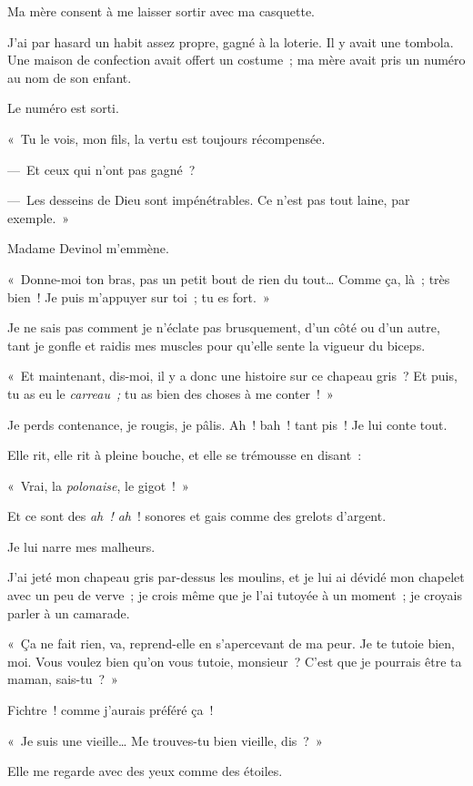 \documentclass[french,twoside]{book} %
\begin{document}
Ma mère consent à me laisser sortir avec ma casquette.\par
J’ai par hasard un habit assez propre, gagné à la loterie. Il y avait une tombola. Une maison de confection avait offert un costume ; ma mère avait pris un numéro au nom de son enfant.\par
Le numéro est sorti.\par
« Tu le vois, mon fils, la vertu est toujours récompensée.\par
— Et ceux qui n’ont pas gagné ?\par
— Les desseins de Dieu sont impénétrables. Ce n’est pas tout laine, par exemple. »\par
\bigbreak
\noindent Madame Devinol m’emmène.\par
« Donne-moi ton bras, pas un petit bout de rien du tout… Comme ça, là ; très bien ! Je puis m’appuyer sur toi ; tu es fort. »\par
Je ne sais pas comment je n’éclate pas brusquement, d’un côté ou d’un autre, tant je gonfle et raidis mes muscles pour qu’elle sente la vigueur du biceps.\par
« Et maintenant, dis-moi, il y a donc une histoire sur ce chapeau gris ? Et puis, tu as eu le \emph{carreau ;} tu as bien des choses à me conter ! »\par
Je perds contenance, je rougis, je pâlis. Ah ! bah ! tant pis ! Je lui conte tout.\par
Elle rit, elle rit à pleine bouche, et elle se trémousse en disant :\par
« Vrai, la\emph{ polonaise}, le gigot ! »\par
Et ce sont des \emph{ah ! ah} ! sonores et gais comme des grelots d’argent.\par
Je lui narre mes malheurs.\par
J’ai jeté mon chapeau gris par-dessus les moulins, et je lui ai dévidé mon chapelet avec un peu de verve ; je crois même que je l’ai tutoyée à un moment ; je croyais parler à un camarade.\par
« Ça ne fait rien, va, reprend-elle en s’apercevant de ma peur. Je te tutoie bien, moi. Vous voulez bien qu’on vous tutoie, monsieur ? C’est que je pourrais être ta maman, sais-tu ? »\par
Fichtre ! comme j’aurais préféré ça !\par
« Je suis une vieille… Me trouves-tu bien vieille, dis ? »\par
Elle me regarde avec des yeux comme des étoiles.\par
\end{document}
